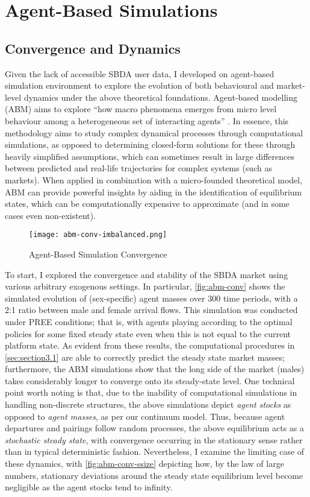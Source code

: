 \section{Agent-Based Simulations}
\label{sec:section4}  
\subsection{Convergence and Dynamics}
Given the lack of accessible SBDA user data, I developed on agent-based simulation environment to explore the evolution of both behavioural and market-level dynamics under the above theoretical foundations. Agent-based modelling (ABM) aims to explore ``how macro phenomena emerges from micro level behaviour among a heterogeneous set of interacting agents'' \citep{janssen2005agent}. In essence, this methodology aims to study complex dynamical processes through computational simulations, as opposed to determining closed-form solutions for these through heavily simplified assumptions, which can sometimes result in large differences between predicted and real-life trajectories for complex systems (such as markets).
When applied in combination with a micro-founded theoretical model, ABM can provide powerful insights by aiding in the identification of equilibrium states, which can be computationally expensive to approximate (and in some cases even non-existent).

\begin{figure}[ht]
    \centering
    \caption{Agent-Based Simulation Convergence}
    \texttt{[image: abm-conv-imbalanced.png]}
    \label{fig:abm-conv} 
\end{figure}

To start, I explored the convergence and stability of the SBDA market using various arbitrary exogenous settings. In particular, \autoref{fig:abm-conv} shows the simulated evolution of (sex-specific) agent masses over 300 time periods, with a 2:1 ratio between male and female arrival flows. This simulation was conducted under PREE conditions; that is, with agents playing according to the optimal policies for some fixed steady state even when this is not equal to the current platform state. As evident from these results, the computational procedures in \autoref{sec:section3.1} are able to correctly predict the steady state market masses; furthermore, the ABM simulations show that the long side of the market (males) takes considerably longer to converge onto its steady-state level. One technical point worth noting is that, due to the inability of computational simulations in handling non-discrete structures, the above simulations depict \textit{agent stocks} as opposed to \textit{agent masses}, as per our continuum model. Thus, because agent departures and pairings follow random processes, the above equilibrium acts as a \textit{stochastic steady state}, with convergence occurring in the stationary sense rather than in typical deterministic fashion. Nevertheless, I examine the limiting case of these dynamics, with \autoref{fig:abm-conv-ssize} depicting how, by the law of large numbers, stationary deviations around the steady state equilibrium level become negligible as the agent stocks tend to infinity. 

